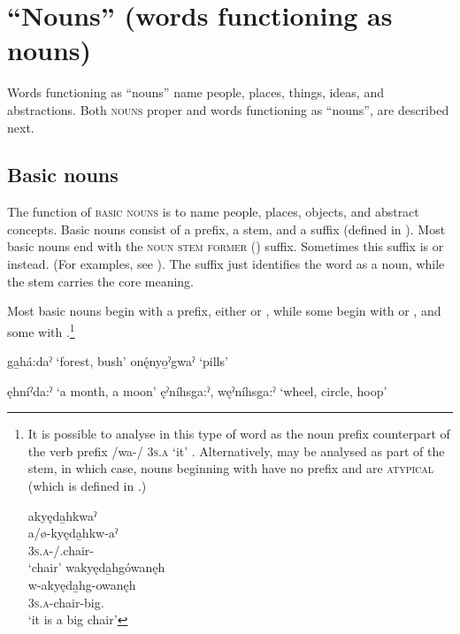 \chapter{“Nouns” (words functioning as nouns)}\label{“Nouns” (words functioning as nouns)}
Words functioning as “nouns” name people, places, things, ideas, and abstractions. Both \textsc{nouns} proper and words functioning as “nouns”, are described next.

\largerpage
\section{Basic nouns} \label{ch:Basic nouns}
The function of \textsc{basic nouns} is to name people, places, objects, and abstract concepts. Basic nouns consist of a prefix, a stem, and a suffix (defined in ). Most basic nouns end with the  \textsc{noun stem former} (\textsc{\nsf}) suffix. Sometimes this suffix is  or  instead. (For examples, see ). The suffix just identifies the word as a noun, while the stem carries the core meaning.

Most basic nouns begin with a prefix, either  or  , while some begin with  or  , and some with  .\footnote{It is possible to analyse  in this type of word as the noun prefix counterpart  of the verb prefix /wa-/ \textsc{3s.a} ‘it’ . Alternatively,  may be analysed as part of the stem, in which case, nouns beginning with  have no prefix and are \textsc{atypical} (which is defined in .)

\ea\label{ex:ppselex2} 
\ea akyęda̱hkwaˀ\\\label{ex:ppselex2a}
\gll a/ø-kyęda̱hkw-aˀ\\
\textsc{3s.a}-/{\noprefix.}chair-{\nounstemformer}\\
\glt ‘chair’
\ex wakyęda̱hgówanęh \\\label{ex:ppselex2b}
\gll w-akyęda̱hg-owanęh \\
\textsc{3s.a}-chair-big.{\stative}\\
\glt ‘it is a big chair’
\z
\z
} 

\ea\label{ex:baspre}
\ea ga̱há:daˀ ‘forest, bush’
\ex onę́nyo̱ˀgwaˀ ‘pills’
\z
\z

\ea\label{ex:baspre2}
\ea ęhníˀda:ˀ ‘a month, a moon’
\ex ęˀníhsga:ˀ, węˀníhsga:ˀ ‘wheel, circle, hoop’
\z
\z



